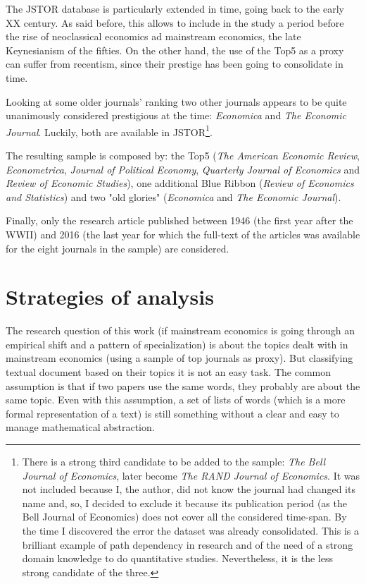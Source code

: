 \documentclass[a4paper, 11pt, headings=standardclasses, tablecaptionsbelow]{scrartcl}
\begin{document}
The JSTOR database is particularly extended in time, going back to the early XX century. As said before, this allows to include in the study a period before the rise of neoclassical economics ad mainstream economics, the late Keynesianism of the fifties.
On the other hand, the use of the Top5 as a proxy can suffer from recentism, since their prestige has been going to consolidate in time.

Looking at some older journals' ranking \parencite[e.g.]{billings1972,hawkins1973,liebowitz1984,malouin1987,moore1972,coats1971} two other journals appears to be quite unanimously considered prestigious at the time: \textit{Economica} and \textit{The Economic Journal}. Luckily, both are available in JSTOR\footnote{There is a strong third candidate to be added to the sample: \textit{The Bell Journal of Economics}, later become \textit{The RAND Journal of Economics}. It was not included because I, the author, did not know the journal had changed its name and, so, I decided to exclude it because its publication period (as the Bell Journal of Economics) does not cover all the considered time-span. By the time I discovered the error the dataset was already consolidated. This is a brilliant example of path dependency in research and of the need of a strong domain knowledge to do quantitative studies. Nevertheless, it is the less strong candidate of the three.}.

The resulting sample is composed by: the Top5 (\textit{The American Economic Review}, \textit{Econometrica}, \textit{Journal of Political Economy}, \textit{Quarterly Journal of Economics} and \textit{Review of Economic Studies}), one additional Blue Ribbon (\textit{Review of Economics and Statistics}) and two "old glories" (\textit{Economica} and \textit{The Economic Journal}).

Finally, only the research article published between 1946 (the first year after the WWII) and 2016 (the last year for which the full-text of the articles was available for the eight journals in the sample) are considered.

\section{Strategies of analysis}
The research question of this work (if mainstream economics is going through an empirical shift and a pattern of specialization) is about the topics dealt with in mainstream economics (using a sample of top journals as proxy).
But classifying textual document based on their topics it is not an easy task. The common assumption is that if two papers use the same words, they probably are about the same topic. Even with this assumption, a set of lists of words (which is a more formal representation of a text) is still something without a clear and easy to manage mathematical abstraction.
\end{document}
